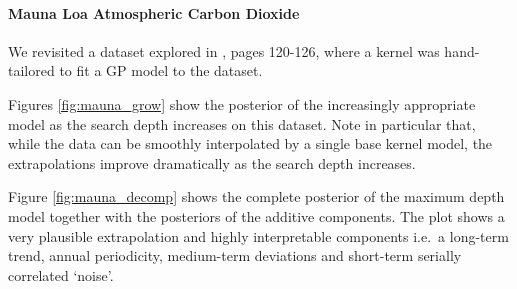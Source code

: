 \documentclass[twoside]{article}
\begin{document}

\paragraph{Mauna Loa Atmospheric Carbon Dioxide}

We revisited a dataset explored in \cite{rasmussen38gaussian}, pages 120-126, where a kernel was hand-tailored to fit a GP model to the dataset.

Figures \ref{fig:mauna_grow} show the posterior of the increasingly appropriate model as the search depth increases on this dataset.
Note in particular that, while the data can be smoothly interpolated by a single base kernel model, the extrapolations improve dramatically as the search depth increases.

Figure \ref{fig:mauna_decomp} shows the complete posterior of the maximum depth model together with the posteriors of the additive components.
The plot shows a very plausible extrapolation and highly interpretable components i.e.~a long-term trend, annual periodicity, medium-term deviations and short-term serially correlated `noise'.
\end{document}

